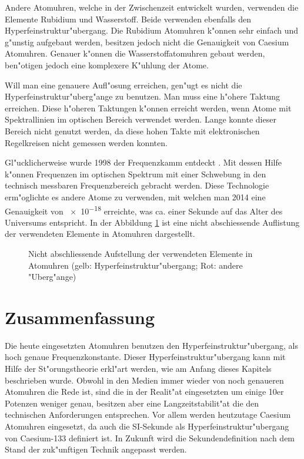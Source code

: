 \begin{refsection}
Andere Atomuhren, welche in der Zwischenzeit entwickelt wurden,
verwenden die Elemente Rubidium und Wasserstoff.  Beide verwenden
ebenfalls den Hyperfeinstruktur"ubergang.  Die Rubidium Atomuhren
k"onnen sehr einfach und g"unstig aufgebaut werden, besitzen jedoch
nicht die Genauigkeit von Caesium Atomuhren.  Genauer k"onnen die
Wasserstoffatomuhren gebaut werden, ben"otigen jedoch eine komplexere
K"uhlung der Atome.

Will man eine genauere Aufl"osung erreichen, gen"ugt es nicht die
Hyperfeinstruktur"uberg"ange zu benutzen.  Man muss eine h"ohere
Taktung erreichen.  Diese h"oheren Taktungen k"onnen erreicht werden,
wenn Atome mit Spektrallinien im optischen Bereich verwendet werden.
Lange konnte dieser Bereich nicht genutzt werden, da diese hohen
Takte mit elektronischen Regelkreisen nicht gemessen werden konnten.

Gl"ucklicherweise wurde 1998 der Frequenzkamm entdeckt
%
\cite{SdW:kamm}.  Mit dessen Hilfe k"onnen Frequenzen im optischen
Spektrum mit einer Schwebung in den technisch messbaren
Frequenzbereich gebracht werden.  Diese Technologie erm"oglichte es
andere Atome zu verwenden, mit welchen man 2014 eine Genauigkeit von
\num{e-18} erreichte, was ca. einer Sekunde auf das Alter des
Universums entspricht.  In der Abbildung \ref{fig:periode} ist eine
nicht abschiessende Auflistung der verwendeten Elemente in Atomuhren
dargestellt.

\begin{figure}
  \centering
  
  \caption{Nicht abschliessende Aufstellung der verwendeten Elemente
    in Atomuhren (gelb: Hyperfeinstruktur"ubergang; Rot: andere
    "Uberg"ange)}
  \label{fig:periode}
\end{figure}

\section{Zusammenfassung}
Die heute eingesetzten Atomuhren benutzen den
Hyperfeinstruktur"ubergang, als hoch genaue Frequenzkonstante.  Dieser
Hyperfeinstruktur"ubergang kann mit Hilfe der St"orungstheorie
erkl"art werden, wie am Anfang dieses Kapitels beschrieben wurde.
Obwohl in den Medien immer wieder von noch genaueren Atomuhren die
Rede ist, sind die in der Realit"at eingesetzten um einige 10er
Potenzen weniger genau, besitzen aber eine Langzeitstabilit"at die den
technischen Anforderungen entsprechen.  Vor allem werden heutzutage
Caesium Atomuhren eingesetzt, da auch die SI-Sekunde als
Hyperfeinstruktur"ubergang von Caesium-133 definiert ist.  In Zukunft
wird die Sekundendefinition nach dem Stand der zuk"unftigen Technik
angepasst werden.

\printbibliography[heading=subbibliography]
\end{refsection}

